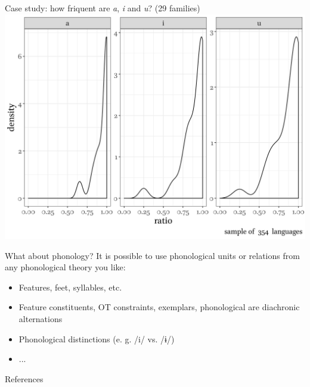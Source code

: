 \documentclass[13pt, t]{beamer}
\begin{document}
\begin{frame}{Case study: how friquent are \textit{a}, \textit{i} and \textit{u}? (29 families)}
\includegraphics[width = \linewidth]{images/08_distributions}
\end{frame}

\begin{frame}{What about phonology?}
It is possible to use phonological units or relations from any phonological theory you like:
\begin{itemize}
\item Features, feet, syllables, etc.
\item Feature constituents, OT constraints, exemplars, phonological are diachronic alternations
\item Phonological distinctions (e. g. /i/ vs. /ɨ/)
\item ...
\end{itemize}
\end{frame}



\begin{frame}{References}
\footnotesize


\end{frame}
\end{document}
